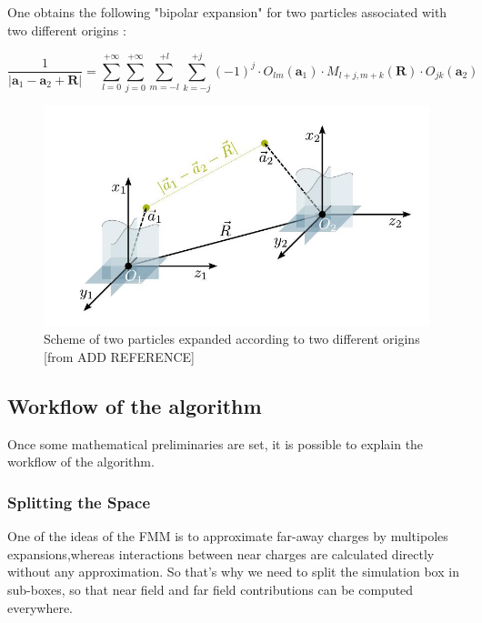 \documentclass[12pt,twoside,a4paper]{report}
\begin{document}
	One obtains the following "bipolar expansion" for two particles associated with two different origins :
	
    \begin{equation}
    \frac{1}{|\textbf{a}_1 - \textbf{a}_2 + \textbf{R}|} = 
    \sum\limits_{l=0}^{+\infty}
    \sum\limits_{j=0}^{+\infty}
    \sum\limits_{m=-l}^{+l}
    \sum\limits_{k=-j}^{+j}
    (-1)^j \cdot O_{lm}(\textbf{a}_1) \cdot M_{l+j,m+k}(\textbf{R}) \cdot O_{jk}(\textbf{a}_2)
    \end{equation}



	\begin{figure}[H]

    \includegraphics[scale=0.7]{bipolar}
    \centering 
    \caption{Scheme of two particles expanded according to two different origins [from ADD REFERENCE]}
    \label{fig:bipolar}
    \end{figure}




	
	\subsection{Workflow of the algorithm}
	
	Once some mathematical preliminaries are set, it is possible to explain the workflow of the algorithm.
	
	\subsubsection{Splitting the Space}
	
	One of the ideas of the FMM is to approximate far-away charges by multipoles expansions,whereas interactions between near charges are calculated directly without any approximation. So that's why we need to split the simulation box in sub-boxes, so that near field and far field contributions can be computed everywhere. 	
	
\end{document}
